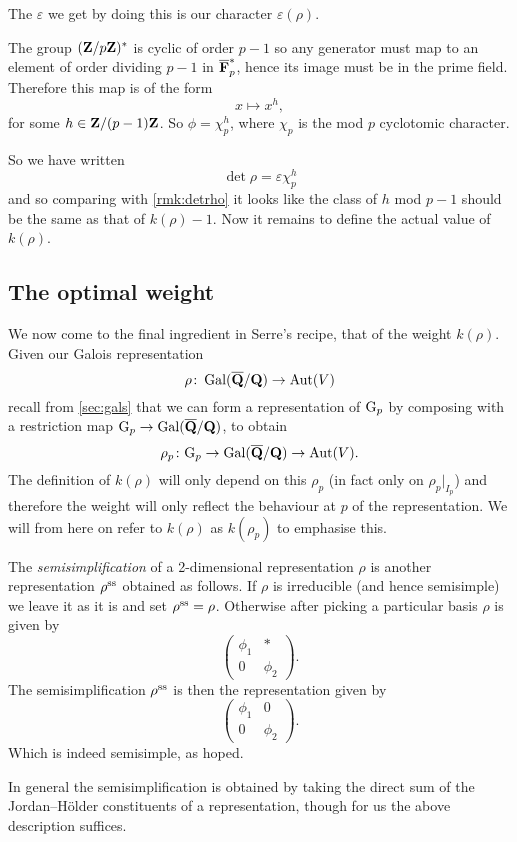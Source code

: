 \documentclass[a4paper,12pt]{article}
\begin{document}
The $\varepsilon$ we get by doing this is our character $\varepsilon(\rho)$.

The group $(\mathbf{Z}/p\mathbf{Z})^*$ is cyclic of order $p-1$ so any generator must map to an element of order dividing $p-1$ in $\overline{\mathbf{F}}_p^*$, hence its image must be in the prime field.
Therefore this map is of the form
\[
x \mapsto x^h,
\]
for some $h \in \mathbf{Z}/(p-1)\mathbf{Z}$.
So $\phi = \chi_p^h$, where $\chi_p$ is the mod $p$ cyclotomic character. %

So we have written
\[
\det\rho = \varepsilon \chi_p^h
\]
and so comparing with \cref{rmk:detrho} it looks like the class of $h$ mod $p-1$ should be the same as that of $k(\rho)-1$.
Now it remains to define the actual value of $k(\rho)$.



\subsection{The optimal weight}
We now come to the final ingredient in Serre's recipe, that of the weight $k(\rho)$.
Given our Galois representation
\[
\rho \colon \operatorname{Gal}(\overline{\mathbf{Q}}/\mathbf{Q}) \to \operatorname{Aut}(V)
\]
recall from \cref{sec:gals} that we can form a representation of $\mathrm{G}_p$ by composing with a restriction map $\mathrm{G}_p \to\operatorname{Gal}(\overline{\mathbf{Q}}/\mathbf{Q})$, to obtain
\[
\rho_p\colon \mathrm{G}_p \to \operatorname{Gal}(\overline{\mathbf{Q}}/\mathbf{Q}) \to \operatorname{Aut}(V).
\]
The definition of $k(\rho)$ will only depend on this $\rho_p$ (in fact only on $\rho_p|_{I_p}$) and therefore the weight will only reflect the behaviour at $p$ of the representation. %
We will from here on refer to $k(\rho)$ as $k(\rho_p)$ to emphasise this.

\begin{defn}
The \emph{semisimplification} of a 2-dimensional representation $\rho$ is another representation $\rho^\text{ss}$ obtained as follows.
If $\rho$ is irreducible (and hence semisimple) we leave it as it is and set $\rho^\text{ss} = \rho$.
Otherwise after picking a particular basis $\rho$ is given by
\[
\begin{pmatrix}
\phi_1 & * \\
0      & \phi_2
\end{pmatrix}.
\]
The semisimplification $\rho^\text{ss}$ is then the representation given by
\[
\begin{pmatrix}
\phi_1 & 0 \\
0      & \phi_2
\end{pmatrix}.
\]
Which is indeed semisimple, as hoped.

In general the semisimplification is obtained by taking the direct sum of the Jordan--H\"older constituents of a representation, though for us the above description suffices.
\end{defn}
\end{document}
